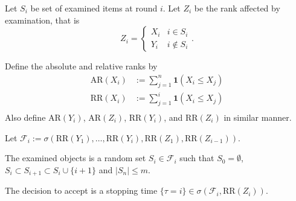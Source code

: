 
Let $S_i$ be set of examined items at round $i$. Let $Z_i$ be the rank affected by examination, that is \[
Z_i = \begin{cases}
	X_i & i \in S_i \\
	Y_i & i \not \in S_i
\end{cases}
.\] 

Define the absolute and relative ranks by 
\begin{align}
	\text{AR}(X_i) &:= \sum_{j=1}^n \textbf{1}(X_i \le X_j) \\
	\text{RR}(X_i) &:= \sum_{j=1}^i \textbf{1}(X_i \le X_j) \\
\end{align}
Also define $\text{AR}(Y_i)$, $\text{AR}(Z_i)$, $\text{RR}(Y_i)$, and $\text{RR}(Z_i)$ in similar manner.

Let $\mathcal{F}_i := \sigma\left(\text{RR}(Y_1),\ldots,\text{RR}(Y_i),\text{RR}(Z_1), \text{RR}(Z_{i-1}) \right) $.

The examined objects is a random set $S_i \in \mathcal{F}_i$ such that $S_0 = \emptyset$, $S_i \subset S_{i+1} \subset S_i \cup \{i+1\}$ and $|S_n| \le  m$.

The decision to accept is a stopping time $\{\tau = i\} \in \sigma\left( \mathcal{F}_i, \text{RR}(Z_i) \right) $. 

